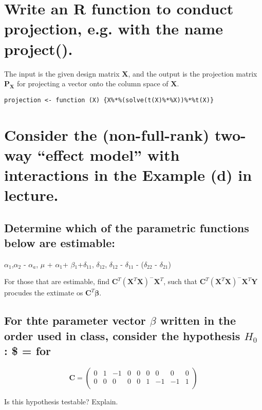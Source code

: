 \documentclass[11pt]{article}
\begin{document}
\section{Write an R function to conduct projection, e.g. with the name project().}
\label{sec-4}

The input is the given design matrix $\mathbf{X}$, and the output is
the projection matrix $\mathbf{P_X}$ for projecting a vector onto the
column space of $\mathbf{X}$.


\begin{verbatim}
projection <- function (X) {X%*%(solve(t(X)%*%X))%*%t(X)}
\end{verbatim}
\section{Consider the (non-full-rank) two-way ``effect model'' with interactions in the Example (d) in lecture.}
\label{sec-5}
\subsection{Determine which of the parametric functions below are estimable:}
\label{sec-5-1}


$\alpha$$_1$,$\alpha$$_2$ - $\alpha$$_a$, $\mu$ + $\alpha$$_1$+ $\beta$$_1$+$\delta$$_{\mathrm{11}}$,
$\delta$$_{\mathrm{12}}$, $\delta$$_{\mathrm{12}}$ - $\delta$$_{\mathrm{11}}$ - ($\delta$$_{\mathrm{22}}$ - $\delta$$_{\mathrm{21}}$)

For those that are estimable, find $\mathbf{C}^T
(\mathbf{X}^{T}\mathbf{X})^{-}\mathbf{X}^{T}$, such that  $\mathbf{C}^T
(\mathbf{X}^{T}\mathbf{X})^{-}\mathbf{X}^{T}\mathbf{Y}$ procudes the
extimate os $\mathbf{C}^{T}\mathbf{\beta}$.
\subsection{For thte parameter vector $\beta$ written in the order used in class, consider the hypothesis $H_0$ : \$ =  for}
\label{sec-5-2}




$$\mathbf{C} =
\begin{pmatrix}{}
    0 &   1 &  -1 &   0 &   0 &   0 &   0 &   0 &   0 \\ 
    0 &   0 &   0 &   0 &   0 &   1 &  -1 &  -1 &   1 \\ 
  \end{pmatrix}$$

Is this hypothesis testable? Explain.
\end{document}
